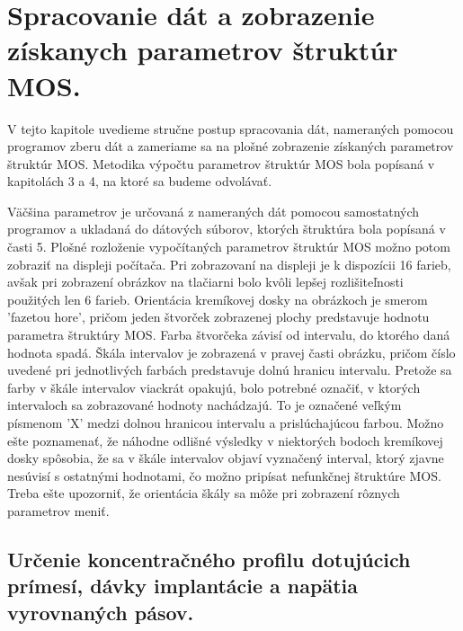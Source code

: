 
\chapter{Spracovanie dát a zobrazenie získanych parametrov štruktúr MOS.} %

\label{Chapter6} %


V tejto kapitole uvedieme stručne postup spracovania dát, nameraných
pomocou programov zberu dát a zameriame sa na plošné zobrazenie
získaných parametrov štruktúr MOS. Metodika výpočtu parametrov
štruktúr MOS bola popísaná v kapitolách 3 a 4, na ktoré sa budeme
odvolávať.

Väčšina parametrov je určovaná z nameraných dát pomocou samostatných
programov a ukladaná do dátových súborov, ktorých štruktúra bola
popísaná v časti 5. Plošné rozloženie vypočítaných parametrov štruktúr
MOS možno potom zobraziť na displeji počítača. Pri zobrazovaní na
displeji je k dispozícii 16 farieb, avšak pri zobrazení obrázkov na
tlačiarni bolo kvôli lepšej rozlišiteľnosti použitých len 6
farieb. Orientácia kremíkovej dosky na obrázkoch je smerom 'fazetou
hore', pričom jeden štvorček zobrazenej plochy predstavuje hodnotu
parametra štruktúry MOS. Farba štvorčeka závisí od intervalu, do
ktorého daná hodnota spadá. Škála intervalov je zobrazená v pravej
časti obrázku, pričom číslo uvedené pri jednotlivých farbách
predstavuje dolnú hranicu intervalu. Pretože sa farby v škále
intervalov viackrát opakujú, bolo potrebné označiť, v ktorých
intervaloch sa zobrazované hodnoty nachádzajú. To je označené veľkým
písmenom 'X' medzi dolnou hranicou intervalu a prislúchajúcou
farbou. Možno ešte poznamenať, že náhodne odlišné výsledky v
niektorých bodoch kremíkovej dosky spôsobia, že sa v škále intervalov
objaví vyznačený interval, ktorý zjavne nesúvisí s ostatnými
hodnotami, čo možno pripísat nefunkčnej štruktúre MOS. Treba ešte
upozorniť, že orientácia škály sa môže pri zobrazení rôznych
parametrov meniť.

\section{Určenie koncentračného profilu dotujúcich prímesí, dávky implantácie a napätia vyrovnaných pásov.}\label{sec:6.1}

